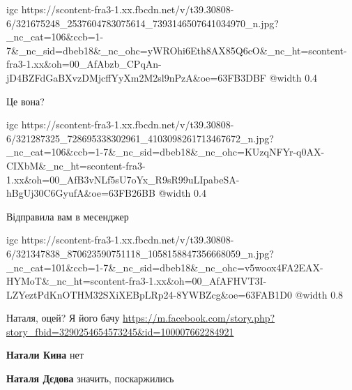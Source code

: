 
\ifcmt
  igc https://scontent-fra3-1.xx.fbcdn.net/v/t39.30808-6/321675248_2537604783075614_7393146507641034970_n.jpg?_nc_cat=106&ccb=1-7&_nc_sid=dbeb18&_nc_ohc=yWROhi6Eth8AX85Q6cO&_nc_ht=scontent-fra3-1.xx&oh=00_AfAbzb_CPqAn-jD4BZFdGaBXvzDMjcffYyXm2M2sl9nPzA&oe=63FB3DBF
  @width 0.4
\fi


Це вона?

\ifcmt
  igc https://scontent-fra3-1.xx.fbcdn.net/v/t39.30808-6/321287325_728695338302961_4103098261713467672_n.jpg?_nc_cat=106&ccb=1-7&_nc_sid=dbeb18&_nc_ohc=KUzqNFYr-q0AX-CIXbM&_nc_ht=scontent-fra3-1.xx&oh=00_AfB3vNLf5sU7oYx_R9sR99uLIpabeSA-hBgUj30C6GyufA&oe=63FB26BB
  @width 0.4
\fi


Відправила вам в месенджер

\begin{center}
\begin{minipage}{\textwidth}

\ifcmt
  igc https://scontent-fra3-1.xx.fbcdn.net/v/t39.30808-6/321347838_870623590751118_1058158847356668059_n.jpg?_nc_cat=101&ccb=1-7&_nc_sid=dbeb18&_nc_ohc=v5woox4FA2EAX-HYMoT&_nc_ht=scontent-fra3-1.xx&oh=00_AfAFHVT3I-LZYeztPdKnOTHM32SXiXEBpLRp24-8YWBZcg&oe=63FAB1D0
  @width 0.8
\fi
\end{minipage}
\end{center}


Наталя, оцей? Я його бачу
\url{https://m.facebook.com/story.php?story_fbid=3290254654573245&id=100007662284921}

\begin{itemize} %
\textbf{Натали Кина} нет

\textbf{Наталя Дєдова} значить, поскаржились🤬
\end{itemize} %

